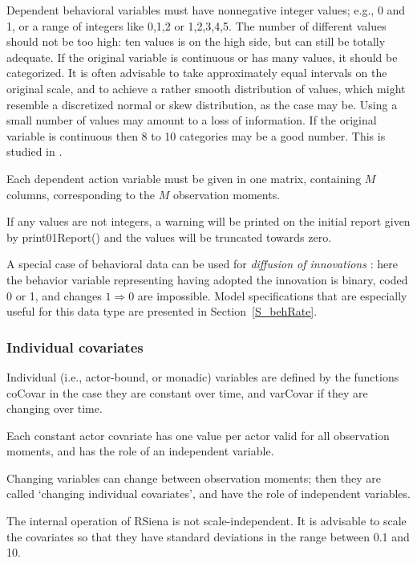 \documentclass[a4paper,fleqn,11pt]{article}
\newcommand{\+}{\, + \,}
\newcommand{\sfn}[1]{\textsf{#1}}
\newcommand{\RS}{{\sf RSiena }}
\begin{document}
Dependent behavioral variables must have nonnegative integer values;
e.g., 0 and 1, or a range of integers like 0,1,2 or 1,2,3,4,5.
The number of different values should not be too high: ten values
is on the high side, but can still be totally adequate.
If the original variable is continuous or has many values,
it should be categorized. It is often advisable to take
approximately equal intervals on the original scale, and to achieve
a rather smooth distribution of values, which might resemble a
discretized normal or skew distribution, as the case may be.
Using a small number of values may amount to a loss of information.
If the original variable is continuous then 8 to 10 categories may be
a good number. This is studied in \citet[][Chapter 6]{Niezink2018a}.


Each dependent action variable must be given in one
matrix, containing $M$ columns, corresponding to the $M$
observation moments.

If any values are not integers, a warning will be printed on the initial report
given by \sfn{print01Report()} and the values will be truncated towards zero.

A special case of behavioral data can be used for
\emph{diffusion of innovations} \citep{Greenan15}:
here the behavior variable representing
having adopted the innovation is binary, coded 0 or 1, and
changes $1 \Rightarrow 0$ are impossible.
Model specifications that are especially useful for this data type
are presented in Section~\ref{S_behRate}.

\subsubsection{Individual covariates}

Individual (i.e., actor-bound, or monadic) variables
are defined by the functions
\sfn{coCovar} in the case they are constant over time,
and \sfn{varCovar} if they are changing over time.

Each constant actor covariate has one value per actor
valid for all observation moments, and has the role of an
independent variable.

Changing variables can change between observation moments;
then they are called `changing individual covariates',
and have the role of independent variables.

The internal operation of \RS is not scale-independent.
It is advisable to scale the covariates so that they have
standard deviations in the range between 0.1 and 10.
\end{document}

